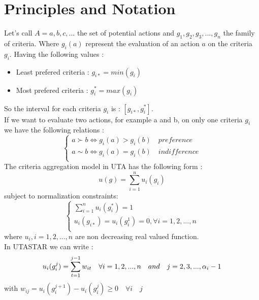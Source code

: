 \documentclass{report}
\begin{document}
\section{Principles and Notation}
Let's call $A={a,b,c,...}$ the set of potential actions and $g_1, g_2, g_3, ..., g_n$ the family of criteria. Where $g_i(a)$ represent the evaluation of an action $a$ on the criteria $g_i$. Having the following values : 
\begin{itemize}
\item Least prefered criteria : $g_{i*} = min (g_i)$
\item Most prefered criteria : $g_i^{*} = max (g_i)$ 
\end{itemize}
So the interval for each criteria $g_i$ is : $[g_{i*} , g_i^{*}]$.\\
If we want to evaluate two actions, for example a and b, on only one criteria $g_i$ we have the following relations : 
\begin{equation}
      \begin{cases}
      	a \succ b\Leftrightarrow g_i(a) > g_i(b) \quad preference\\
      	a\sim b \Leftrightarrow g_i(a) = g_i(b) \quad indifference \\
      \end{cases}
\end{equation}
The criteria aggregation model in UTA has the following form :
\begin{equation}\label{eq1}
      u(g) = \sum_{i=1}^{n} u_i (g_i)
\end{equation}
subject to normalization constraints:\\
\begin{equation}\label{eq2}
      \begin{cases}
      	\sum_{i=1}^{n} u_i(g_{i}^{*}) = 1\\
       	u_i(g_{i*})= u_i(g_i^1)  = 0,  \forall i = 1, 2, ..., n\\
      \end{cases}
\end{equation}
where $ u_i, i = 1,2,...,n$ are non decreasing real valued function.\\

In UTASTAR we can write : 
\begin{equation}
	u_i(g_i^j) =	  \sum_{t=1}^{j-1} w_{it} \quad \forall i = 1,2,...,n \quad and \quad j = 2,3,...,\alpha _i -1 \\
\end{equation}
with $w_{ij} = u_i(g_i^{j+1}) - u_i(g_i^{j}) \geq 0 \quad \forall i \quad j $ \\
\end{document}
